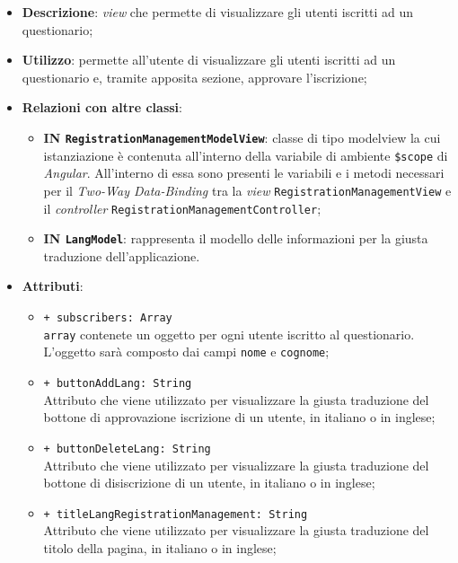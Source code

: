 \begin{itemize}
	\item \textbf{Descrizione}: \textit{view} che permette di visualizzare gli utenti iscritti ad un questionario;
	\item \textbf{Utilizzo}: permette all'utente di visualizzare gli utenti iscritti ad un questionario e, tramite apposita sezione, approvare l'iscrizione;
	\item \textbf{Relazioni con altre classi}:
	\begin{itemize}
		\item \textbf{IN \texttt{RegistrationManagementModelView}}: classe di tipo modelview la cui istanziazione è contenuta all'interno della variabile di ambiente \texttt{\$scope} di \textit{Angular}. All'interno di essa sono presenti le variabili e i metodi necessari per il \textit{Two-Way Data-Binding} tra la \textit{view} \texttt{RegistrationManagementView} e il \textit{controller} \texttt{RegistrationManagementController};
		\item \textbf{IN \texttt{LangModel}}: rappresenta il modello delle informazioni per la giusta traduzione dell'applicazione.
	\end{itemize}
	\item \textbf{Attributi}:
	\begin{itemize}
		\item \texttt{+ subscribers: Array} \\ \texttt{array} contenete un oggetto per ogni utente iscritto al questionario. L'oggetto sarà composto dai campi \texttt{nome} e \texttt{cognome};
		\item \texttt{+ buttonAddLang: String} \\ Attributo che viene utilizzato per visualizzare la giusta traduzione del bottone di approvazione iscrizione di un utente, in italiano o in inglese;
		\item \texttt{+ buttonDeleteLang: String} \\ Attributo che viene utilizzato per visualizzare la giusta traduzione del bottone di disiscrizione di un utente, in italiano o in inglese;
		\item \texttt{+ titleLangRegistrationManagement: String} \\ Attributo che viene utilizzato per visualizzare la giusta traduzione del titolo della pagina, in italiano o in inglese;		
	\end{itemize}
\end{itemize}